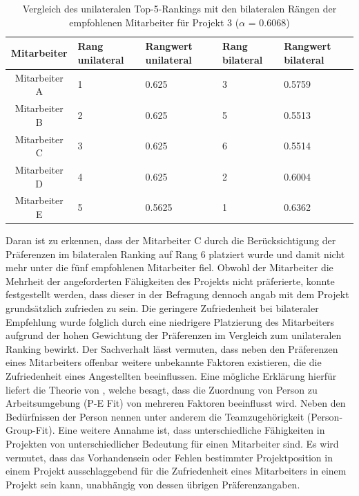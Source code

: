 \begin{table}[htbp]
    \begin{center}
    \begin{tabular}{c|p{0.7in}|p{0.7in}|p{0.7in}|p{0.7in}}
    {\textbf{Mitarbeiter}} & {\textbf{Rang unilateral}} & {\textbf{Rangwert unilateral}} & {\textbf{Rang bilateral}} & {\textbf{Rangwert bilateral}} \\
    \hline
	Mitarbeiter A & \hfil1 & \hfil0.625 & \hfil3 & \hfil0.5759 \\
    \hline
    Mitarbeiter B & \hfil2 & \hfil0.625 & \hfil5 & \hfil0.5513 \\
    \hline
	Mitarbeiter C & \hfil3 & \hfil0.625 & \hfil6 & \hfil0.5514 \\
    \hline
	Mitarbeiter D & \hfil4 & \hfil0.625 & \hfil2 & \hfil0.6004 \\
    \hline
	Mitarbeiter E & \hfil5 & \hfil0.5625 & \hfil1 & \hfil0.6362 \\
    \end{tabular}
    \end{center}
    \caption[Vergleich des unilateralen Top-5-Rankings mit den bilateralen Rängen der empfohlenen Mitarbeiter für Projekt 3 ($\alpha$ = 0.6068)]{Vergleich des unilateralen Top-5-Rankings mit den bilateralen Rängen der empfohlenen Mitarbeiter für Projekt 3 ($\alpha$ = 0.6068)}
	\label{tab:diskussion:tab1}
\end{table}

Daran ist zu erkennen, dass der Mitarbeiter C durch die Berücksichtigung der Präferenzen im bilateralen Ranking auf Rang 6 platziert wurde und damit nicht mehr unter die fünf empfohlenen Mitarbeiter fiel.
Obwohl der Mitarbeiter die Mehrheit der angeforderten Fähigkeiten des Projekts nicht präferierte, konnte festgestellt werden, dass dieser in der Befragung dennoch angab mit dem Projekt grundsätzlich zufrieden zu sein.
Die geringere Zufriedenheit bei bilateraler Empfehlung wurde folglich durch eine niedrigere Platzierung des Mitarbeiters aufgrund der hohen Gewichtung der Präferenzen im Vergleich zum unilateralen Ranking bewirkt.
Der Sachverhalt lässt vermuten, dass neben den Präferenzen eines Mitarbeiters offenbar weitere unbekannte Faktoren existieren, die die Zufriedenheit eines Angestellten beeinflussen.
Eine mögliche Erklärung hierfür liefert die Theorie von \textcite[S. 1ff.]{malinowski:2006}, welche besagt, dass die Zuordnung von Person zu Arbeitsumgebung (\ac{P-E Fit}) von mehreren Faktoren beeinflusst wird.
Neben den Bedürfnissen der Person nennen \textcite[S. 1ff.]{malinowski:2006} unter anderem die Teamzugehörigkeit (Person-Group-Fit).
Eine weitere Annahme ist, dass unterschiedliche Fähigkeiten in Projekten von unterschiedlicher Bedeutung für einen Mitarbeiter sind.
Es wird vermutet, dass das Vorhandensein oder Fehlen bestimmter Projektposition in einem Projekt ausschlaggebend für die Zufriedenheit eines Mitarbeiters in einem Projekt sein kann, unabhängig von dessen übrigen Präferenzangaben.

